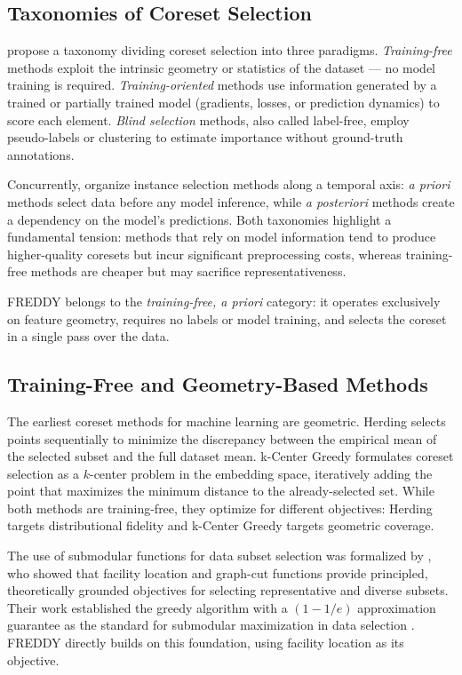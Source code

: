 \documentclass{article}
\begin{document}
\subsection{Taxonomies of Coreset Selection}

\cite{MoseretalSurvey} propose a taxonomy dividing coreset selection into three paradigms.
\textit{Training-free} methods exploit the intrinsic geometry or statistics of the dataset — no model training is required.
\textit{Training-oriented} methods use information generated by a trained or partially trained model (gradients, losses, or prediction dynamics) to score each element.
\textit{Blind selection} methods, also called label-free, employ pseudo-labels or clustering to estimate importance without ground-truth annotations.

Concurrently, \cite{Weinreich2025Survey} organize instance selection methods along a temporal axis: \textit{a priori} methods select data before any model inference, while \textit{a posteriori} methods create a dependency on the model's predictions.
Both taxonomies highlight a fundamental tension: methods that rely on model information tend to produce higher-quality coresets but incur significant preprocessing costs, whereas training-free methods are cheaper but may sacrifice representativeness.

FREDDY belongs to the \textit{training-free, a priori} category: it operates exclusively on feature geometry, requires no labels or model training, and selects the coreset in a single pass over the data.

\subsection{Training-Free and Geometry-Based Methods}

The earliest coreset methods for machine learning are geometric.
Herding \cite{Welling2009Herding} selects points sequentially to minimize the discrepancy between the empirical mean of the selected subset and the full dataset mean.
k-Center Greedy \cite{Sener2018ActiveLearning} formulates coreset selection as a $k$-center problem in the embedding space, iteratively adding the point that maximizes the minimum distance to the already-selected set.
While both methods are training-free, they optimize for different objectives: Herding targets distributional fidelity and k-Center Greedy targets geometric coverage.

The use of submodular functions for data subset selection was formalized by \cite{Wei2015Submodularity}, who showed that facility location and graph-cut functions provide principled, theoretically grounded objectives for selecting representative and diverse subsets.
Their work established the greedy algorithm with a $(1 - 1/e)$ approximation guarantee as the standard for submodular maximization in data selection \cite{Nemhauser1978a}.
FREDDY directly builds on this foundation, using facility location as its objective.
\end{document}

